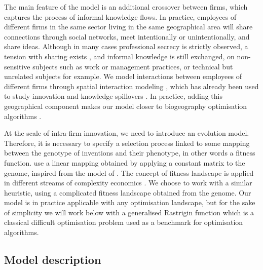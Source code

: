 \documentclass[letterpaper]{article}
\begin{document}
The main feature of the model is an additional crossover between firms, which captures the process of informal knowledge flows. In practice, employees of different firms in the same sector living in the same geographical area will share connections through social networks, meet intentionally or unintentionally, and share ideas. Although in many cases professional secrecy is strictly observed, a tension with sharing exists \citep{rouyre2019managing}, and informal knowledge is still exchanged, on non-sensitive subjects such as work or management practices, or technical but unrelated subjects for example. We model interactions between employees of different firms through spatial interaction modeling \citep{wilson1975some}, which has already been used to study innovation and knowledge spillovers \citep{lesage2007knowledge}. In practice, adding this geographical component makes our model closer to biogeography optimisation algorithms \citep{simon2008biogeography}.

At the scale of intra-firm innovation, we need to introduce an evolution model. Therefore, it is necessary to specify a selection process linked to some mapping between the genotype of inventions and their phenotype, in other words a fitness function. \cite{ma2005agent} use a linear mapping obtained by applying a constant matrix to the genome, inspired from the model of \cite{kauffman1995technological}. The concept of fitness landscape is applied in different streams of complexity economics \citep{khraisha2020complex}. We choose to work with a similar heuristic, using a complicated fitness landscape obtained from the genome. Our model is in practice applicable with any optimisation landscape, but for the sake of simplicity we will work below with a generalised Rastrigin function which is a classical difficult optimisation problem used as a benchmark for optimisation algorithms.


\subsection{Model description}
\end{document}
